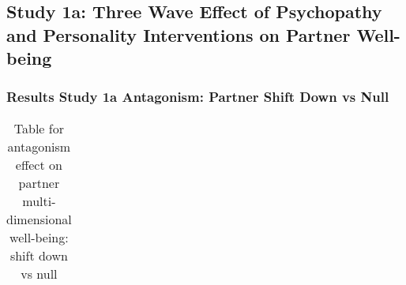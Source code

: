 \documentclass[
  singlecolumn]{article}
\begin{document}
\subsection{Study 1a: Three Wave Effect of Psychopathy and Personality
Interventions on Partner
Well-being}\label{study-1a-three-wave-effect-of-psychopathy-and-personality-interventions-on-partner-well-being}

\subsubsection{Results Study 1a Antagonism: Partner Shift Down vs
Null}\label{results-study-1a-antagonism-partner-shift-down-vs-null}

\begin{longtable}[]{@{}
  >{\raggedright\arraybackslash}p{}
  >{\raggedleft\arraybackslash}p{}
  >{\raggedleft\arraybackslash}p{}
  >{\raggedleft\arraybackslash}p{}
  >{\raggedleft\arraybackslash}p{}
  >{\raggedleft\arraybackslash}p{}@{}}

\caption{\label{tbl-results-antagonism-partner-down}Table for antagonism
effect on partner multi-dimensional well-being: shift down vs null}

\tabularnewline


\end{longtable}
\end{document}

